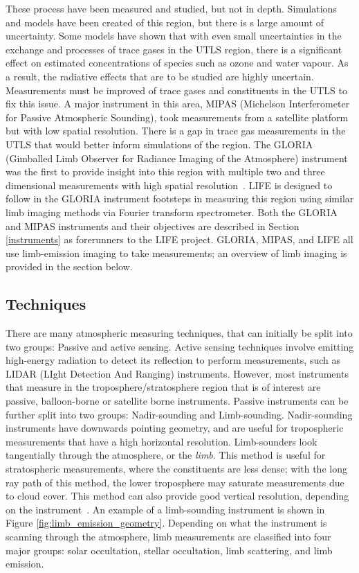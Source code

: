 These process have been measured and studied, but not in depth. Simulations and models have been created of this region, but there is s large amount of uncertainty. Some models have shown that with even small uncertainties in the exchange and processes of trace gases in the UTLS region, there is a significant effect on estimated concentrations of species such as ozone and water vapour. As a result, the radiative effects that are to be studied are highly uncertain. Measurements must be improved of trace gases and constituents in the UTLS to fix this issue. A major instrument in this area, MIPAS (Michelson Interferometer for Passive Atmospheric Sounding), took measurements from a satellite platform but with low spatial resolution. There is a gap in trace gas measurements in the UTLS that would better inform simulations of the region. The GLORIA (Gimballed Limb Observer for Radiance Imaging of the Atmosphere) instrument was the first to provide insight into this region with multiple two and three dimensional measurements with high spatial resolution~\citep{GLORIA_objectives}. LIFE is designed to follow in the GLORIA instrument footsteps in measuring this region using similar limb imaging methods via Fourier transform spectrometer. Both the GLORIA and MIPAS instruments and their objectives are described in Section \ref{instruments} as forerunners to the LIFE project. GLORIA, MIPAS, and LIFE all use limb-emission imaging to take measurements; an overview of limb imaging is provided in the section below.

\subsection{Techniques} \label{techniques}
There are many atmospheric measuring techniques, that can initially be split into two groups: Passive and active sensing. Active sensing techniques involve emitting high-energy radiation to detect its reflection to perform measurements, such as LIDAR (LIght Detection And Ranging) instruments. However, most instruments that measure in the troposphere/stratosphere region that is of interest are passive, balloon-borne or satellite borne instruments. Passive instruments can be further split into two groups: Nadir-sounding and Limb-sounding. Nadir-sounding instruments have downwards pointing geometry, and are useful for tropospheric measurements that have a high horizontal resolution. Limb-sounders look tangentially through the atmosphere, or the \textit{limb}. This method is useful for stratospheric measurements, where the constituents are less dense; with the long ray path of this method, the lower troposphere may saturate measurements due to cloud cover. This method can also provide good vertical resolution, depending on the instrument~\citep{SPARC}. An example of a limb-sounding instrument is shown in Figure \ref{fig:limb_emission_geometry}. Depending on what the instrument is scanning through the atmosphere, limb measurements are classified into four major groups: solar occultation, stellar occultation, limb scattering, and limb emission.

